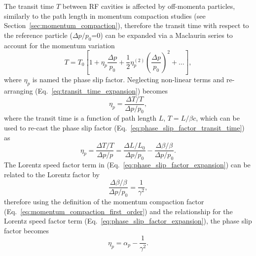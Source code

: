 \documentclass[../main.tex]{subfiles}
\begin{document}
The transit time $T$ between RF cavities is affected by off-momenta particles, similarly to the path length in momentum compaction studies (see Section~\ref{sec:momentum_compaction}), therefore the transit time with respect to the reference particle ($\Delta p/p_{0}$=0) can be expanded via a Maclaurin series to account for the momentum variation
\begin{equation}
T = T_{0}\left[1+\eta_{p}\frac{\Delta p}{p_{0}}+\frac{1}{2}\eta_{p}^{\left(2\right)}\left(\frac{\Delta p}{p_{0}}\right)^{2}+\ldots\right],
\label{eq:transit_time_expansion}    
\end{equation}
where $\eta_{p}$ is named the phase slip factor. Neglecting non-linear terms and re-arranging (Eq.~\ref{eq:transit_time_expansion}) becomes
\begin{equation}
\eta_{p} = \frac{\Delta T/T}{\Delta p/p_{0}},
\label{eq:phase_slip_factor_transit_time}    
\end{equation}
where the transit time is a function of path length $L$, $T = L/\beta c$, which can be used to re-cast the phase slip factor (Eq.~\ref{eq:phase_slip_factor_transit_time}) as  
\begin{equation}
\eta_{p} = \frac{\Delta T/T}{\Delta p/p} = \frac{\Delta L/L_{0}}{\Delta p/p_{0}}-\frac{\Delta\beta/\beta}{\Delta p/p_{0}}.
\label{eq:phase_slip_factor_expansion}    
\end{equation}
The Lorentz speed factor term in (Eq.~\ref{eq:phase_slip_factor_expansion}) can be related to the Lorentz factor \cite{wolski2012longitudinal} by 
\begin{equation}
\frac{\Delta\beta/\beta}{\Delta p/p_{0}} = \frac{1}{\gamma^{2}},
\label{eq:phase_slip_Lorentz_relation}    
\end{equation}
therefore using the definition of the momentum compaction factor (Eq.~\ref{eq:momentum_compaction_first_order}) and the relationship for the Lorentz speed factor term (Eq.~\ref{eq:phase_slip_factor_expansion}), the phase slip factor becomes
\begin{equation}
\eta_{p} = \alpha_{p} - \frac{1}{\gamma^{2}}.
\label{eq:phase_slip_factor}    
\end{equation}
\end{document}
